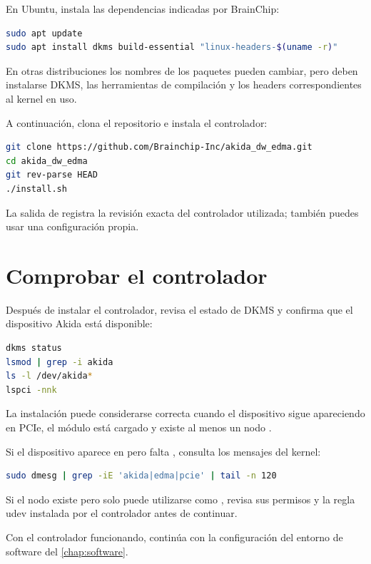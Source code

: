 En Ubuntu, instala las dependencias indicadas por BrainChip:

\begin{lstlisting}[language=bash]
sudo apt update
sudo apt install dkms build-essential "linux-headers-$(uname -r)"
\end{lstlisting}

En otras distribuciones los nombres de los paquetes pueden cambiar, pero deben
instalarse DKMS, las herramientas de compilación y los headers correspondientes al
kernel en uso.

A continuación, clona el repositorio e instala el controlador:

\begin{lstlisting}[language=bash]
git clone https://github.com/Brainchip-Inc/akida_dw_edma.git
cd akida_dw_edma
git rev-parse HEAD
./install.sh
\end{lstlisting}

La salida de  registra la revisión exacta del controlador
utilizada; también puedes usar una configuración propia.

\section{Comprobar el controlador}

Después de instalar el controlador, revisa el estado de DKMS y confirma que el dispositivo
Akida está disponible:

\begin{lstlisting}[language=bash]
dkms status
lsmod | grep -i akida
ls -l /dev/akida*
lspci -nnk
\end{lstlisting}

La instalación puede considerarse correcta cuando el dispositivo sigue apareciendo
en PCIe, el módulo está cargado y existe al menos un nodo .

Si el dispositivo aparece en  pero falta , consulta los
mensajes del kernel:

\begin{lstlisting}[language=bash]
sudo dmesg | grep -iE 'akida|edma|pcie' | tail -n 120
\end{lstlisting}

Si el nodo existe pero solo puede utilizarse como , revisa sus permisos y
la regla udev instalada por el controlador antes de continuar.

Con el controlador funcionando, continúa con la configuración del entorno de software
del \cref{chap:software}.
